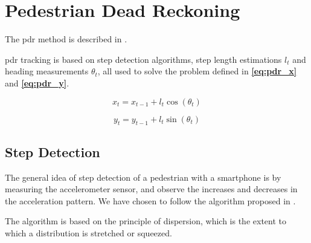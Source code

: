 \section{Pedestrian Dead Reckoning}

The \gls{pdr} method is described in \cite{HybridPositioningPaper}. 



\gls{pdr} tracking is based on step detection algorithms, step length estimations $l_t$ and heading measurements $\theta_t$, all used to solve the problem defined in \textbf{\autoref{eq:pdr_x}} and \textbf{\autoref{eq:pdr_y}}.

\begin{equation} \label{eq:pdr_x}
    x_t = x_{t - 1} + l_t\cos(\theta_t)
\end{equation}

\begin{equation} \label{eq:pdr_y}
    y_t = y_{t - 1} + l_t\sin(\theta_t)
\end{equation}








\subsection{Step Detection}

The general idea of step detection of a pedestrian with a smartphone is by measuring the accelerometer sensor, and observe the increases and decreases in the acceleration pattern\cite{HybridPositioningPaper}. We have chosen to follow the algorithm proposed in \cite{peakdetection}. 

The algorithm is based on the principle of dispersion, which is the extent to which a distribution is stretched or squeezed. %


